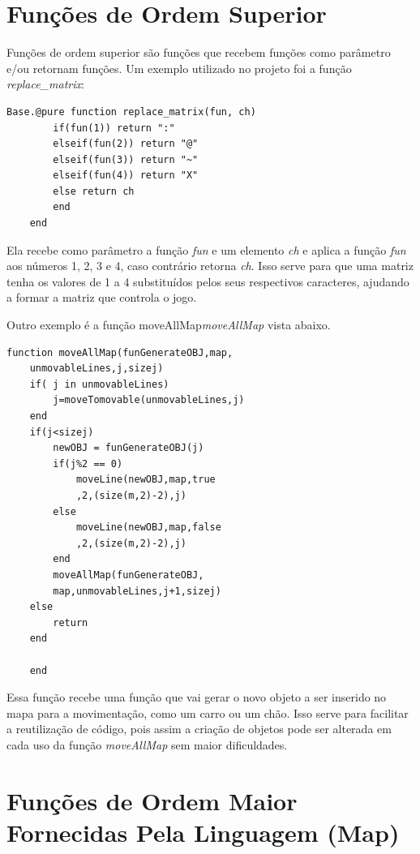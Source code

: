 \documentclass[rel_mlp]{iiufrgs}
\begin{document}
 
 \section{Funções de Ordem Superior}
    
    Funções de ordem superior são funções que recebem funções como parâmetro e/ou retornam funções. Um exemplo utilizado no projeto foi a função \textit{replace\_matrix}:
  
    \begin{lstlisting}[frame=single]
    Base.@pure function replace_matrix(fun, ch)
    	if(fun(1)) return ":"
    	elseif(fun(2)) return "@"
    	elseif(fun(3)) return "~"
    	elseif(fun(4)) return "X"
    	else return ch
    	end
    end
    \end{lstlisting}
    
    Ela recebe como parâmetro a função \textit{fun} e um elemento \textit{ch} e aplica a função \textit{fun} aos números 1, 2, 3 e 4, caso contrário retorna \textit{ch}. Isso serve para que uma matriz tenha os valores de 1 a 4 substituídos pelos seus respectivos caracteres, ajudando a formar a matriz que controla o jogo.
    
    Outro exemplo é a função moveAllMap\textit{moveAllMap} vista abaixo.
    
    \begin{lstlisting}[frame=single]
    function moveAllMap(funGenerateOBJ,map,
    unmovableLines,j,sizej)
	if( j in unmovableLines)
		j=moveTomovable(unmovableLines,j)
	end
	if(j<sizej)
		newOBJ = funGenerateOBJ(j)
		if(j%2 == 0)
			moveLine(newOBJ,map,true
			,2,(size(m,2)-2),j)
		else
			moveLine(newOBJ,map,false
			,2,(size(m,2)-2),j)
		end
		moveAllMap(funGenerateOBJ,
		map,unmovableLines,j+1,sizej)
	else
		return
	end

    end
    \end{lstlisting}
    

    
    Essa função recebe uma função que vai gerar o novo objeto a ser inserido no mapa para a movimentação, como um carro ou um chão. Isso serve para facilitar a reutilização de código, pois assim a criação de objetos pode ser alterada em cada uso da função \textit{moveAllMap} sem maior dificuldades.
   
 
    \section{Funções de Ordem Maior Fornecidas Pela Linguagem (Map)}
 
\end{document}
